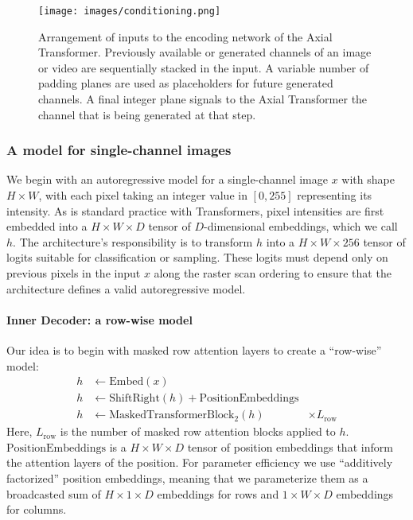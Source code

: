 \documentclass{article} \usepackage{iclr2020_conference,times}
\begin{document}
\begin{figure}[t]
     \centering
     \texttt{[image: images/conditioning.png]}
     \caption{Arrangement of inputs to the encoding network of the Axial Transformer. Previously available or generated channels of an image or video are sequentially stacked in the input. A variable number of padding planes are used as placeholders for future generated channels. A final integer plane signals to the Axial Transformer the channel that is being generated at that step.}
     \label{fig:encoder_conditioning}
\end{figure}

\subsubsection{A model for single-channel images}

We begin with an autoregressive model for a single-channel image $x$ with shape $H \times W$, with each pixel taking an integer value in $[0, 255]$ representing its intensity. As is standard practice with Transformers, pixel intensities are first embedded into a $H \times W \times D$ tensor of $D$-dimensional embeddings, which we call $h$. The architecture's responsibility is to transform $h$ into a $H \times W \times 256$ tensor of logits suitable for classification or sampling. These logits must depend only on previous pixels in the input $x$ along the raster scan ordering to ensure that the architecture defines a valid autoregressive model.

\vspace{-0.5em}
\paragraph{Inner Decoder: a row-wise model}
\label{sec:rowwise}
Our idea is to begin with masked row attention layers to create a ``row-wise'' model:
\begin{align*}
    h &\gets \text{Embed}(x) \\
    h &\gets \text{ShiftRight}(h) + \text{PositionEmbeddings} \\
    h &\gets \text{MaskedTransformerBlock}_{2}(h) &\times L_\text{row}
\end{align*}
Here, $L_\text{row}$ is the number of masked row attention blocks applied to $h$. $\text{PositionEmbeddings}$ is a $H \times W \times D$ tensor of position embeddings that inform the attention layers of the position. For parameter efficiency we use  ``additively factorized'' position embeddings, meaning that we parameterize them as a broadcasted sum of $H \times 1 \times D$ embeddings for rows  and $1 \times W \times D$ embeddings for columns.
\end{document}
